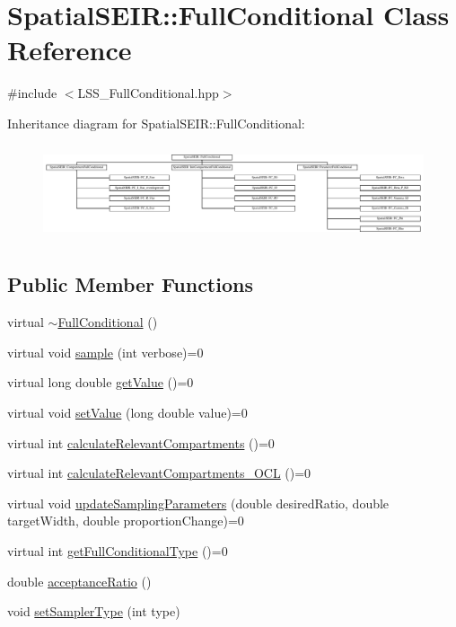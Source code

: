 \hypertarget{classSpatialSEIR_1_1FullConditional}{\section{Spatial\-S\-E\-I\-R\-:\-:Full\-Conditional Class Reference}
\label{classSpatialSEIR_1_1FullConditional}
}


{\ttfamily \#include $<$L\-S\-S\-\_\-\-Full\-Conditional.\-hpp$>$}

Inheritance diagram for Spatial\-S\-E\-I\-R\-:\-:Full\-Conditional\-:\begin{figure}[H]
\begin{center}
\leavevmode
\includegraphics[height=2.828283cm]{classSpatialSEIR_1_1FullConditional}
\end{center}
\end{figure}
\subsection*{Public Member Functions}
\begin{DoxyCompactItemize}
\item 
virtual \hyperlink{classSpatialSEIR_1_1FullConditional_ae3c3cbadab4183ba85f530471bf175c2}{$\sim$\-Full\-Conditional} ()
\item 
virtual void \hyperlink{classSpatialSEIR_1_1FullConditional_aac6928c9c2753acfc2c9e9bbe840ba82}{sample} (int verbose)=0
\item 
virtual long double \hyperlink{classSpatialSEIR_1_1FullConditional_abe67c774a66370686ee9dc6fe6f278f6}{get\-Value} ()=0
\item 
virtual void \hyperlink{classSpatialSEIR_1_1FullConditional_a0834b0bb81ef4f7f368ba87fd784ff39}{set\-Value} (long double value)=0
\item 
virtual int \hyperlink{classSpatialSEIR_1_1FullConditional_a04c671e900a359f5a554817f21a99b5c}{calculate\-Relevant\-Compartments} ()=0
\item 
virtual int \hyperlink{classSpatialSEIR_1_1FullConditional_a77b75e8e1f62175aa0380a2e9aca3d46}{calculate\-Relevant\-Compartments\-\_\-\-O\-C\-L} ()=0
\item 
virtual void \hyperlink{classSpatialSEIR_1_1FullConditional_afd84b9273d641028453aefc06b342782}{update\-Sampling\-Parameters} (double desired\-Ratio, double target\-Width, double proportion\-Change)=0
\item 
virtual int \hyperlink{classSpatialSEIR_1_1FullConditional_a680a2a8af1962a5a99191ff84acf78c5}{get\-Full\-Conditional\-Type} ()=0
\item 
double \hyperlink{classSpatialSEIR_1_1FullConditional_ad9074ca43ff07ee923f08ac0fbf46cc1}{acceptance\-Ratio} ()
\item 
void \hyperlink{classSpatialSEIR_1_1FullConditional_a5aa519fb2a20d3f694890e2d1ab7da48}{set\-Sampler\-Type} (int type)
\end{DoxyCompactItemize}

